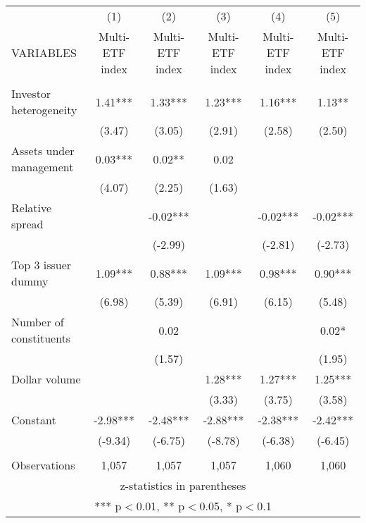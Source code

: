 \documentclass[]{article}
\begin{document}
\begin{tabular}{lccccc} \hline
 & (1) & (2) & (3) & (4) & (5) \\
VARIABLES & Multi-ETF index & Multi-ETF index & Multi-ETF index & Multi-ETF index & Multi-ETF index \\ \hline
 &  &  &  &  &  \\
Investor heterogeneity & 1.41*** & 1.33*** & 1.23*** & 1.16*** & 1.13** \\
 & (3.47) & (3.05) & (2.91) & (2.58) & (2.50) \\
Assets under management & 0.03*** & 0.02** & 0.02 &  &  \\
 & (4.07) & (2.25) & (1.63) &  &  \\
Relative spread &  & -0.02*** &  & -0.02*** & -0.02*** \\
 &  & (-2.99) &  & (-2.81) & (-2.73) \\
Top 3 issuer dummy & 1.09*** & 0.88*** & 1.09*** & 0.98*** & 0.90*** \\
 & (6.98) & (5.39) & (6.91) & (6.15) & (5.48) \\
Number of constituents &  & 0.02 &  &  & 0.02* \\
 &  & (1.57) &  &  & (1.95) \\
Dollar volume &  &  & 1.28*** & 1.27*** & 1.25*** \\
 &  &  & (3.33) & (3.75) & (3.58) \\
Constant & -2.98*** & -2.48*** & -2.88*** & -2.38*** & -2.42*** \\
 & (-9.34) & (-6.75) & (-8.78) & (-6.38) & (-6.45) \\
 &  &  &  &  &  \\
 Observations & 1,057 & 1,057 & 1,057 & 1,060 & 1,060 \\ \hline
\multicolumn{6}{c}{ z-statistics in parentheses} \\
\multicolumn{6}{c}{ *** p$<$0.01, ** p$<$0.05, * p$<$0.1} \\
\end{tabular}
\end{document}

